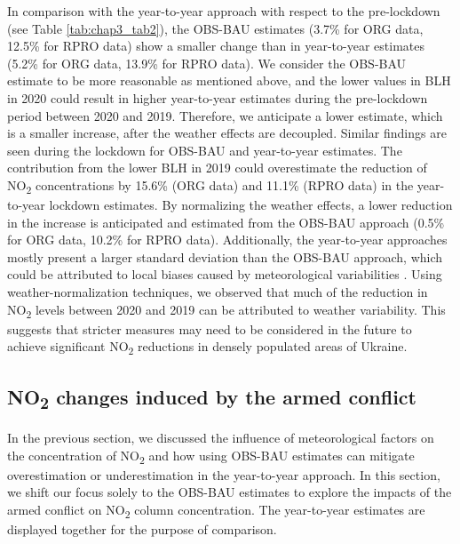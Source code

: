 In comparison with the year-to-year approach with respect to the pre-lockdown (see Table \ref{tab:chap3_tab2}), the OBS-BAU estimates (3.7\% for ORG data, 12.5\% for RPRO data) show a smaller change than in year-to-year estimates (5.2\% for ORG data, 13.9\% for RPRO data). We consider the OBS-BAU estimate to be more reasonable as mentioned above, and the lower values in BLH in 2020 could result in higher year-to-year estimates during the pre-lockdown period between 2020 and 2019. Therefore, we anticipate a lower estimate, which is a smaller increase, after the weather effects are decoupled. Similar findings are seen during the lockdown for OBS-BAU and year-to-year estimates. The contribution from the lower BLH in 2019 could overestimate the reduction of NO\textsubscript{2} concentrations by 15.6\% (ORG data) and 11.1\% (RPRO data) in the year-to-year lockdown estimates. By normalizing the weather effects, a lower reduction in the increase is anticipated and estimated from the OBS-BAU approach (0.5\% for ORG data, 10.2\% for RPRO data). Additionally, the year-to-year approaches mostly present a larger standard deviation than the OBS-BAU approach, which could be attributed to local biases caused by meteorological variabilities \citep{barre2021estimating}. Using weather-normalization techniques, we observed that much of the reduction in NO\textsubscript{2} levels between 2020 and 2019 can be attributed to weather variability. This suggests that stricter measures may need to be considered in the future to achieve significant NO\textsubscript{2} reductions in densely populated areas of Ukraine.\par

\subsection{NO\textsubscript{2} changes induced by the armed conflict} \label{chap3_war}
In the previous section, we discussed the influence of meteorological factors on the concentration of NO\textsubscript{2} and how using OBS-BAU estimates can mitigate overestimation or underestimation in the year-to-year approach. In this section, we shift our focus solely to the OBS-BAU estimates to explore the impacts of the armed conflict on NO\textsubscript{2} column concentration. The year-to-year estimates are displayed together for the purpose of comparison.\par


